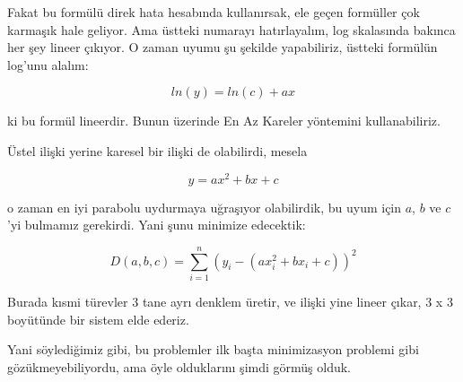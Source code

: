 \documentclass[12pt,fleqn]{article}\usepackage{../../common}
\begin{document}
Fakat bu formülü direk hata hesabında kullanırsak, ele geçen formüller çok
karmaşık hale geliyor. Ama üstteki numarayı hatırlayalım, log skalasında bakınca
her şey lineer çıkıyor. O zaman uyumu şu şekilde yapabiliriz, üstteki formülün
log'unu alalım:

$$ ln(y) = ln(c) + ax $$

ki bu formül lineerdir. Bunun üzerinde En Az Kareler yöntemini
kullanabiliriz. 

Üstel ilişki yerine karesel bir ilişki de olabilirdi, mesela

$$ y = ax^2 + bx + c $$

o zaman en iyi parabolu uydurmaya uğraşıyor olabilirdik, bu uyum için $a$,
$b$ ve $c$'yi bulmamız gerekirdi. Yani şunu minimize edecektik:

$$ D(a,b,c) = \sum_{i=1}^n (y_i - ( ax_i^2 + bx_i + c ))^2  $$

Burada kısmi türevler 3 tane ayrı denklem üretir, ve ilişki yine lineer
çıkar, 3 x 3 boyütünde bir sistem elde ederiz. 

Yani söylediğimiz gibi, bu problemler ilk başta minimizasyon problemi gibi
gözükmeyebiliyordu, ama öyle olduklarını şimdi görmüş olduk. 
\end{document}
